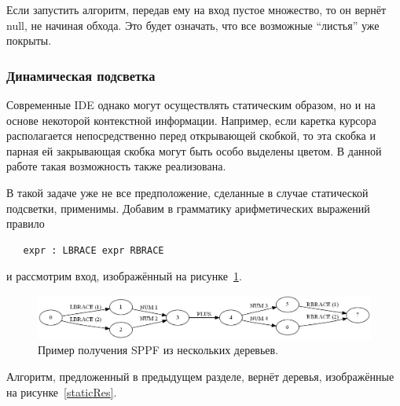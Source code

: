 Если запустить алгоритм, передав ему на вход пустое множество, то он вернёт null, не начиная обхода. Это будет означать, что все возможные ``листья'' уже покрыты. 
\subsubsection{Динамическая подсветка}
Современные IDE однако могут осуществлять статическим образом, но и на основе некоторой контекстной информации. Например, если каретка курсора располагается непосредственно перед открывающей скобкой, то эта скобка и парная ей закрывающая скобка могут быть особо выделены цветом. В данной работе такая возможность также реализована. 

В такой задаче уже не все предположение, сделанные в случае статической подсветки, применимы. Добавим в грамматику арифметических выражений правило 

\begin{verbatim}
   expr : LBRACE expr RBRACE
\end{verbatim}

и рассмотрим вход, изображённый на рисунке~\ref{dynamic_idea}. 

\begin{figure}[t]
\centering
\includegraphics[width=\linewidth]{Ivanov/Pictures/Dynamic_Idea.png}
\caption{Пример получения SPPF из нескольких деревьев.}
\label{dynamic_idea}
\end{figure}

Алгоритм, предложенный в предыдущем разделе, вернёт деревья, изображённые на рисунке~\ref{staticRes}.

